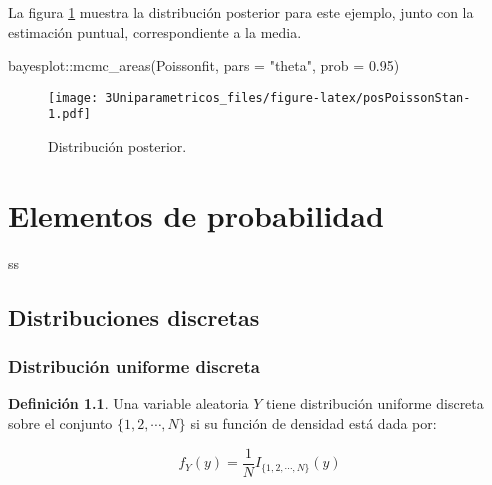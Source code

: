 \documentclass[
  12pt,
  spanish,
]{book}
\newenvironment{Shaded}{\begin{snugshade}}{\end{snugshade}}
\newcommand{\AttributeTok}[1]{\textcolor[rgb]{0.77,0.63,0.00}{#1}}
\newcommand{\FloatTok}[1]{\textcolor[rgb]{0.00,0.00,0.81}{#1}}
\newcommand{\FunctionTok}[1]{\textcolor[rgb]{0.00,0.00,0.00}{#1}}
\newcommand{\NormalTok}[1]{#1}
\newcommand{\SpecialCharTok}[1]{\textcolor[rgb]{0.00,0.00,0.00}{#1}}
\newcommand{\StringTok}[1]{\textcolor[rgb]{0.31,0.60,0.02}{#1}}
\theoremstyle{definition}
\newtheorem{definition}{Definición}[chapter]
\theoremstyle{definition}
\theoremstyle{definition}
\theoremstyle{definition}
\theoremstyle{remark}
\begin{document}
La figura \ref{fig:posPoissonStan} muestra la distribución posterior para este ejemplo, junto con la estimación puntual, correspondiente a la media.

\begin{Shaded}
\begin{Highlighting}[]
\NormalTok{bayesplot}\SpecialCharTok{::}\FunctionTok{mcmc\_areas}\NormalTok{(Poissonfit, }\AttributeTok{pars =} \StringTok{"theta"}\NormalTok{, }
                      \AttributeTok{prob =} \FloatTok{0.95}\NormalTok{)}
\end{Highlighting}
\end{Shaded}

\begin{figure}
\centering
\texttt{[image: 3Uniparametricos\_files/figure-latex/posPoissonStan-1.pdf]}
\caption{\label{fig:posPoissonStan}Distribución posterior.}
\end{figure}

\hypertarget{appendix-apuxe9ndice}{%
\appendix}


\hypertarget{elementos-de-probabilidad}{%
\chapter{Elementos de probabilidad}\label{elementos-de-probabilidad}}

ss

\hypertarget{distribuciones-discretas}{%
\section{Distribuciones discretas}\label{distribuciones-discretas}}

\hypertarget{distribuciuxf3n-uniforme-discreta}{%
\subsection{Distribución uniforme discreta}\label{distribuciuxf3n-uniforme-discreta}}

\begin{definition}
\protect\hypertarget{def:unnamed-chunk-1}{}{\label{def:unnamed-chunk-1} }Una variable aleatoria \(Y\) tiene distribución uniforme discreta sobre el conjunto \(\{1,2,\cdots,N\}\) si su función de densidad está dada por:

\begin{equation}
f_Y(y)=\frac{1}{N}I_{\{1,2,\cdots,N\}}(y)
\end{equation}
\end{definition}
\end{document}
